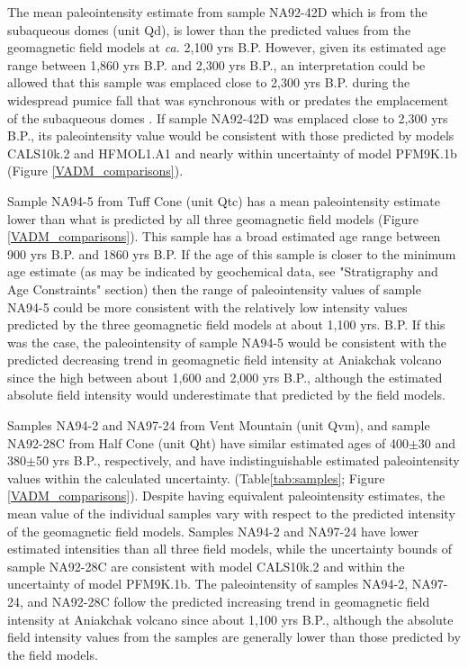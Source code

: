 \documentclass[draft]{agujournal2019}
\begin{document}
The mean paleointensity estimate from sample NA92-42D which is from the subaqueous domes (unit Qd), is lower than the predicted values from the geomagnetic field models at \textit{ca.} 2,100 yrs B.P. However, given its estimated age range between 1,860 yrs B.P. and 2,300 yrs B.P., an interpretation could be allowed that this sample was emplaced close to 2,300 yrs B.P. during the widespread pumice fall that was synchronous with or predates the emplacement of the subaqueous domes \cite{Bacon2014a}. %
If sample NA92-42D was emplaced close to 2,300 yrs B.P., its paleointensity value would be consistent with those  predicted by models CALS10k.2 and HFMOL1.A1 and nearly within uncertainty of model PFM9K.1b  (Figure \ref{VADM_comparisons}). 

Sample NA94-5 from Tuff Cone (unit Qtc) has a mean paleointensity estimate lower than what is predicted by all three geomagnetic field models (Figure \ref{VADM_comparisons}). This sample has a broad estimated age range between 900 yrs B.P. and 1860 yrs B.P. If the age of this sample is closer to the minimum age estimate (as may be indicated by geochemical data, see "Stratigraphy and Age Constraints" section) then the range of paleointensity values of sample NA94-5 could be more consistent with the relatively low intensity values predicted by the three geomagnetic field models at about 1,100 yrs. B.P. If this was the case, the paleointensity of sample NA94-5 would be consistent with the predicted decreasing trend in geomagnetic field intensity at Aniakchak volcano since the high between about 1,600 and 2,000 yrs B.P., although the estimated absolute field intensity would underestimate that predicted by the field models. 

Samples NA94-2 and NA97-24 from Vent Mountain (unit Qvm), and sample NA92-28C from Half Cone (unit Qht) have similar estimated ages of 400$\pm$30 and 380$\pm$50 yrs B.P., respectively, and have indistinguishable estimated paleointensity values within the calculated uncertainty.   (Table\ref{tab:samples}; Figure \ref{VADM_comparisons}). Despite having equivalent paleointensity estimates, the mean value of the individual samples vary with respect to the predicted intensity of the geomagnetic field models. Samples NA94-2 and NA97-24 have lower estimated intensities than all three field models, while the uncertainty bounds of sample NA92-28C are consistent with model CALS10k.2 and within the uncertainty of model PFM9K.1b. The paleointensity of samples NA94-2, NA97-24, and NA92-28C follow the predicted increasing trend in geomagnetic field intensity at Aniakchak volcano since about 1,100 yrs B.P., although the absolute field intensity values from the samples are generally lower than those predicted by the field models.
\end{document}
